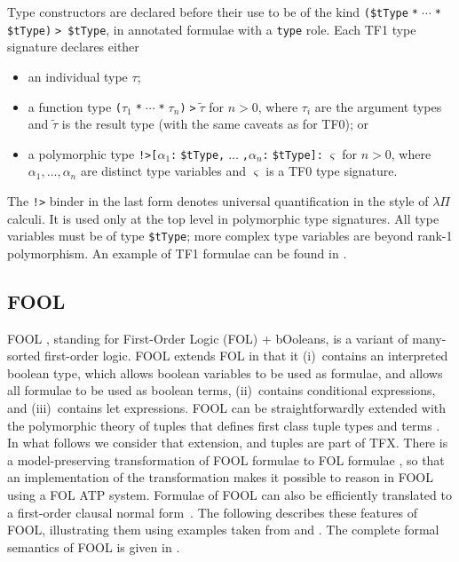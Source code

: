 \documentclass{easychair}
\begin{document}
Type constructors are declared before their use to be of the kind
{\tt (\$tType$\;$*$\;{\cdots}\;$*$\;$\$tType)$\;$> \$tType}, in annotated 
formulae with a {\tt type} role.
Each TF1 type signature declares either
\begin{itemize}
\item an individual type $\tau$;
\item a function type {\tt ($\tau_1\;$*$\;{\cdots}\;$*$\;\tau_n$)$\;$>$\;\tilde \tau$}
      for $n > 0$, where $\tau_i$ are the argument types and $\tilde \tau$
      is the result type (with the same caveats as for TF0); or
\item a polymorphic type {\tt !>[$\alpha_1$:$\;$\$tType,$\;{\dots}\;$,$\alpha_n$:$\;$\$tType]:$\;\varsigma$}
      for $n > 0$, where $\alpha_1,\dots,\alpha_n$ are distinct
      type variables and $\varsigma$ is a TF0 type signature.
\end{itemize}

The {\tt !>} binder in the last form denotes universal quantification in the
style of $\lambda\Pi$ calculi.
It is used only at the top level in polymorphic type signatures.
All type variables must be of type {\tt \$tType}; more complex type variables
are beyond rank-1 polymorphism.
An example of TF1 formulae can be found in \cite{KSR16}.

\subsection{FOOL}
\label{FOOL}

FOOL \cite{KKV15}, standing for First-Order Logic (FOL) + bOoleans, is a 
variant of many-sorted first-order logic. 
FOOL extends FOL in that it (i)~contains an interpreted boolean type, which
allows boolean variables to be used as formulae, and allows all formulae to be 
used as boolean terms, (ii)~contains conditional expressions, and 
(iii)~contains let expressions.
FOOL can be straightforwardly extended with the polymorphic theory of tuples 
that defines first class tuple types and terms \cite{KKV18}.
In what follows we consider that extension, and tuples are part of TFX.
There is a model-preserving transformation of FOOL formulae to FOL formulae
\cite{KKV15}, so that an implementation of the transformation makes it 
possible to reason in FOOL using a FOL ATP system.
Formulae of FOOL can also be efficiently translated to a first-order clausal 
normal form~\cite{KK+16-GCAI}. 
The following describes these features of FOOL, illustrating them using 
examples taken from \cite{KK+16} and \cite{KKV18}.
The complete formal semantics of FOOL is given in \cite{KKV15}.
\end{document}
